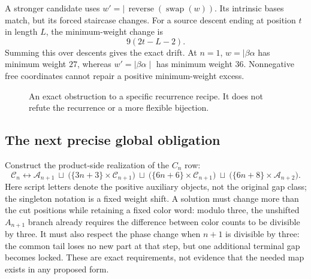 \documentclass[11pt,a4paper]{article}
\theoremstyle{definition}
\newcommand{\SSA}{\mathscr A}
\newcommand{\CC}{\mathscr C}
\begin{document}
A stronger candidate uses
$w'=\mid\,\operatorname{reverse}(\operatorname{swap}(w))$.
Its intrinsic bases match, but its forced staircase changes. For a source
descent ending at position $t$ in length $L$, the minimum-weight change is
\[
9(2t-L-2).
\]
Summing this over descents gives the exact drift. At $n=1$,
$w=\mid\beta\alpha$ has minimum weight $27$, whereas
$w'=\mid\beta\alpha\mid$ has minimum weight $36$. Nonnegative free
coordinates cannot repair a positive minimum-weight excess.

\begin{figure}[ht]
\centering
{}
\caption{An exact obstruction to a specific recurrence recipe.
It does not refute the recurrence or a more flexible bijection.}
\end{figure}

\subsection{The next precise global obligation}

Construct the product-side realization of the $C_n$ row:
\[
\CC_n\longleftrightarrow
\SSA_{n+1}\ \sqcup\
\bigl(\{3n+3\}\times\CC_{n+1}\bigr)\ \sqcup\
\bigl(\{6n+6\}\times\CC_{n+1}\bigr)\ \sqcup\
\bigl(\{6n+8\}\times\SSA_{n+2}\bigr).
\]
Here script letters denote the positive auxiliary objects, not the original
gap class; the singleton notation is a fixed weight shift.
A solution must change more than the cut positions while retaining a fixed
color word: modulo three, the unshifted $A_{n+1}$ branch already requires
the difference between color counts to be divisible by three.
It must also respect the phase change when $n+1$ is divisible by three:
the common tail loses no new part at that step, but one additional terminal
gap becomes locked. These are exact requirements, not evidence that the
needed map exists in any proposed form.
\end{document}
